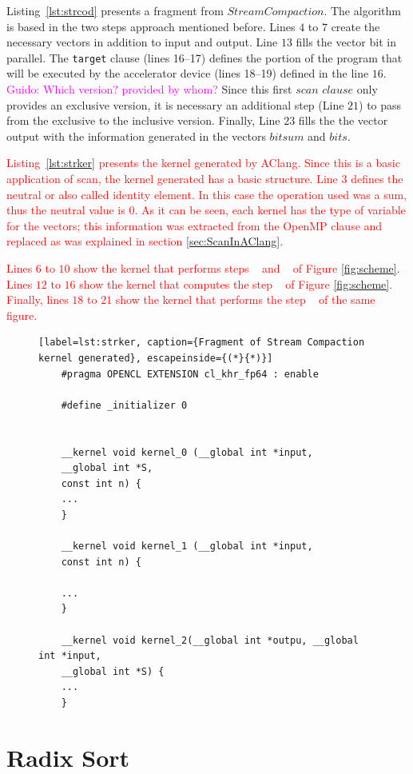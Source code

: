\documentclass[Ingles]{ic-tese-v1}
\newcommand{\guido}[1]{\noindent\textcolor{magenta}{Guido: {#1}}}
\newcommand{\ed}[1]{\noindent\textcolor{red}{ {#1}}}
\newcommand{\guido}[1]{}
\newcommand{\ed}[1]{}
\newcommand{\ttt}[1]{{\texttt{#1}}}
\newcommand{\rlst}[1]{Listing~\ref{lst:#1}}
\begin{document}
\rlst{strcod}  presents a fragment from $Stream Compaction$. The algorithm is based in the two steps approach mentioned before.
Lines $4$ to $7$ create the necessary vectors in addition to input and output.
Line $13$ fills the vector bit in parallel. The \ttt{target} clause (lines 16--17) defines the portion of the program  that will be executed by the accelerator device (lines 18--19) defined in the line $16$.
\guido{Which version? provided by whom?}
Since this first $scan$ $clause$ only provides an exclusive version, it is necessary an additional step (Line $21$) to pass from the exclusive to the inclusive version. Finally, Line $23$ fills the the vector output with the information generated in the vectors $bitsum$ and $bits$.

\ed{\rlst{strker} presents the kernel generated by AClang. Since this is  a basic application of scan, the kernel generated has a basic structure. Line $3$ defines the neutral or also called identity element. In this case the operation used was a sum, thus the neutral value is $0$. As it can be seen, each kernel has the type of variable for the vectors; this information was extracted from the OpenMP clause and replaced as was explained in  section \ref{sec:ScanInAClang}.}

\ed{Lines $6$ to $10$ show the kernel that performs steps ~\ding{182} and ~\ding{183} of Figure \ref{fig:scheme}. Lines $12$ to $16$ show the kernel that computes the step ~\ding{184} of Figure \ref{fig:scheme}. Finally, lines $18$ to $21$ show the kernel that performs the step ~\ding{185} of the same figure.}
 
\begin{figure}[t]
	\lstset{basicstyle=\scriptsize}
	\begin{lstlisting}[label=lst:strker, caption={Fragment of Stream Compaction kernel generated}, escapeinside={(*}{*)}]
	#pragma OPENCL EXTENSION cl_khr_fp64 : enable
	
	#define _initializer 0
	
	
	__kernel void kernel_0 (__global int *input,
	__global int *S,
	const int n) {
	...
	}
	
	__kernel void kernel_1 (__global int *input,
	const int n) {
	
	...
	}
	
	__kernel void kernel_2(__global int *outpu, __global int *input,
	__global int *S) {
	...
	}
	\end{lstlisting}
\end{figure}

\section{Radix Sort}
\label{sec:Quicksort}
\end{document}
